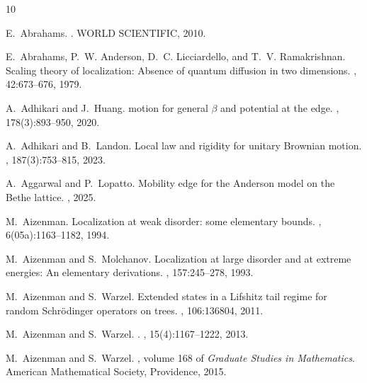 \documentclass[10pt,reqno]{amsart}
\numberwithin{equation}{section}
\numberwithin{figure}{section}
\theoremstyle{plain} %
\theoremstyle{definition} %
\numberwithin{equation}{section}
\begin{document}
\begin{thebibliography}{10}
	
	E.~Abrahams.
	.
	\newblock WORLD SCIENTIFIC, 2010.
	
	E.~Abrahams, P.~W. Anderson, D.~C. Licciardello, and T.~V. Ramakrishnan.
	\newblock Scaling theory of localization: Absence of quantum diffusion in two
	dimensions.
	, 42:673--676, 1979.
	
	A.~Adhikari and J.~Huang.
	 motion for general $\beta$ and potential at the
	edge.
	, 178(3):893--950, 2020.
	
	A.~Adhikari and B.~Landon.
	\newblock Local law and rigidity for unitary {Brownian} motion.
	, 187(3):753--815, 2023.
	
	A.~Aggarwal and P.~Lopatto.
	\newblock Mobility edge for the {Anderson} model on the {Bethe} lattice.
	, 2025.
	
	M.~Aizenman.
	\newblock Localization at weak disorder: some elementary bounds.
	, 6(05a):1163--1182, 1994.
	
	M.~Aizenman and S.~Molchanov.
	\newblock Localization at large disorder and at extreme energies: An elementary
	derivations.
	, 157:245--278, 1993.
	
	M.~Aizenman and S.~Warzel.
	\newblock Extended states in a {L}ifshitz tail regime for random
	{S}chr\"odinger operators on trees.
	, 106:136804, 2011.
	
	M.~Aizenman and S.~Warzel.
	.
	, 15(4):1167--1222, 2013.
	
	M.~Aizenman and S.~Warzel.
	, volume 168 of {\em Graduate Studies in Mathematics}.
	\newblock American Mathematical Society, Providence, 2015.
	

\end{thebibliography}
\end{document}
